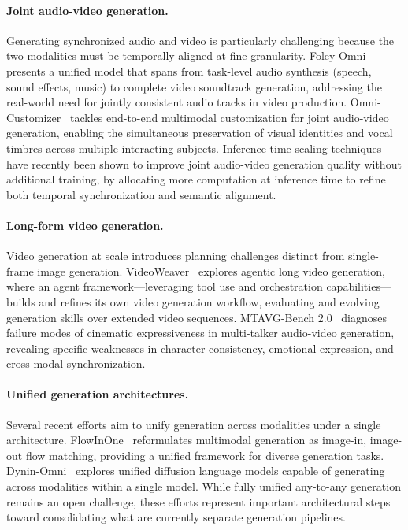 \documentclass{article}
\begin{document}
\paragraph{Joint audio-video generation.}
Generating synchronized audio and video is particularly challenging because the two modalities must be temporally aligned at fine granularity.
Foley-Omni~\cite{placeholder2026foleyomni} presents a unified model that spans from task-level audio synthesis (speech, sound effects, music) to complete video soundtrack generation, addressing the real-world need for jointly consistent audio tracks in video production.
Omni-Customizer~\cite{placeholder2026omnicustomizer} tackles end-to-end multimodal customization for joint audio-video generation, enabling the simultaneous preservation of visual identities and vocal timbres across multiple interacting subjects.
Inference-time scaling techniques~\cite{placeholder2026infertimescale} have recently been shown to improve joint audio-video generation quality without additional training, by allocating more computation at inference time to refine both temporal synchronization and semantic alignment.

\paragraph{Long-form video generation.}
Video generation at scale introduces planning challenges distinct from single-frame image generation.
VideoWeaver~\cite{placeholder2026videoweaver} explores agentic long video generation, where an agent framework---leveraging tool use and orchestration capabilities---builds and refines its own video generation workflow, evaluating and evolving generation skills over extended video sequences.
MTAVG-Bench 2.0~\cite{placeholder2026mtavbench} diagnoses failure modes of cinematic expressiveness in multi-talker audio-video generation, revealing specific weaknesses in character consistency, emotional expression, and cross-modal synchronization.

\paragraph{Unified generation architectures.}
Several recent efforts aim to unify generation across modalities under a single architecture.
FlowInOne~\cite{placeholder2026flowinone} reformulates multimodal generation as image-in, image-out flow matching, providing a unified framework for diverse generation tasks.
Dynin-Omni~\cite{placeholder2026dyninomni} explores unified diffusion language models capable of generating across modalities within a single model.
While fully unified any-to-any generation remains an open challenge, these efforts represent important architectural steps toward consolidating what are currently separate generation pipelines.
\end{document}
